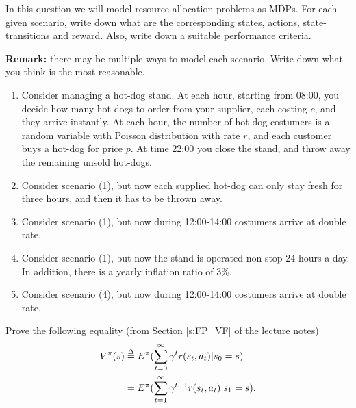 \begin{exercise}
In this question we will model resource allocation problems as MDPs. For each given scenario, write down what are the corresponding states, actions, state-transitions and reward. Also, write down a suitable performance criteria.

\textbf{Remark:} there may be multiple ways to model each scenario. Write down what you think is the most reasonable.

\begin{enumerate}
  \item Consider managing a hot-dog stand. At each hour, starting from 08:00, you decide how many hot-dogs to order from your supplier, each costing $c$, and they arrive instantly. At each hour, the number of hot-dog costumers is a random variable with Poisson distribution with rate $r$, and each customer buys a hot-dog for price $p$. At time 22:00 you close the stand, and throw away the remaining unsold hot-dogs.
  \item Consider scenario (1), but now each supplied hot-dog can only stay fresh for three hours, and then it has to be thrown away.
  \item Consider scenario (1), but now during 12:00-14:00 costumers arrive at double rate.
  \item Consider scenario (1), but now the stand is operated non-stop 24 hours a day. In addition, there is a yearly inflation ratio of 3\%.
  \item Consider scenario (4), but now during 12:00-14:00 costumers arrive at double rate.
\end{enumerate}
\end{exercise}

\begin{exercise}
Prove the following equality (from Section \ref{s:FP_VF} of the lecture notes)
\begin{align*}
V_{}^\pi (s) &\buildrel \Delta \over = {E^\pi }(\sum\limits_{t = 0}^\infty  {{\gamma ^t}r({s_t},{a_t})} |{s_0} = s)\\
 &= {E^\pi }(\sum\limits_{t = 1}^\infty  {{\gamma ^{t - 1}}r({s_t},{a_t})} |{s_1} = s).
\end{align*}
\end{exercise}

